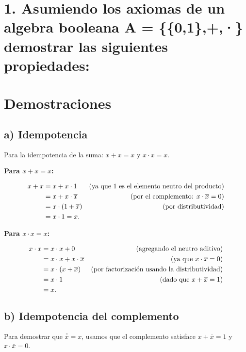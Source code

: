 \documentclass[11pt,letterpaper]{article}
\begin{document}
\section*{1. Asumiendo los axiomas de un algebra booleana A = \{\{0,1\},+,·\} demostrar las siguientes propiedades:}
\section*{Demostraciones}

\subsection*{a) Idempotencia}

Para la idempotencia de la suma: \( x + x = x \) y \( x \cdot x = x \).

\textbf{Para \( x + x = x \):}

\[\begin{aligned}
x + x &= x + x \cdot 1 & \text{(ya que 1 es el elemento neutro del producto)} \\
      &= x + x \cdot \overline{x} & \text{(por el complemento: \( x \cdot \overline{x} = 0 \))} \\
      &= x \cdot (1 + \overline{x}) & \text{(por distributividad)} \\
      &= x \cdot 1 = x.
\end{aligned}
\]

\textbf{Para \( x \cdot x = x \):}

\[
\begin{aligned}
x \cdot x &= x \cdot x + 0 & \text{(agregando el neutro aditivo)} \\
          &= x \cdot x + x \cdot \overline{x} & \text{(ya que \( x \cdot \overline{x} = 0 \))} \\
          &= x \cdot (x + \overline{x}) & \text{(por factorización usando la distributividad)} \\
          &= x \cdot 1 & \text{(dado que \( x + \overline{x} = 1 \))} \\
          &= x.
\end{aligned}
\]

\subsection*{b) Idempotencia del complemento}

Para demostrar que \( \overline{\overline{x}} = x \), usamos que el complemento satisface \( x + \overline{x} = 1 \) y \( x \cdot \overline{x} = 0 \).
\end{document}
